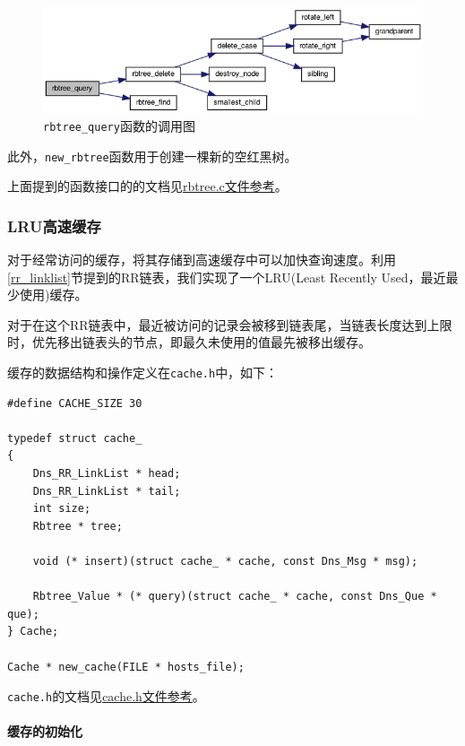 \documentclass[lang=cn,11pt,a4paper,cite=authornum]{paper}
\begin{document}
\begin{figure}[htbp]

    \centering
    \includegraphics[width=0.8\linewidth]{./APIdoc/rbtree_8c_a7460cf092b0132ece0a692cd84a26456_cgraph.png}
    \caption{\texttt{rbtree_query}函数的调用图\label{fig:rbtree_query_call}}

\end{figure}

此外，\texttt{new_rbtree}函数用于创建一棵新的空红黑树。

上面提到的函数接口的的文档见\href{run:./APIdoc/rbtree_8c.html}{rbtree.c文件参考}。

\subsubsection{LRU高速缓存}

对于经常访问的缓存，将其存储到高速缓存中可以加快查询速度。利用\ref{rr_linklist}节提到的RR链表，我们实现了一个LRU(Least Recently Used，最近最少使用)缓存。

对于在这个RR链表中，最近被访问的记录会被移到链表尾，当链表长度达到上限时，优先移出链表头的节点，即最久未使用的值最先被移出缓存。

缓存的数据结构和操作定义在\texttt{cache.h}中，如下：

\begin{code}
\begin{verbatim}
#define CACHE_SIZE 30
 
typedef struct cache_
{
    Dns_RR_LinkList * head; 
    Dns_RR_LinkList * tail; 
    int size; 
    Rbtree * tree; 
    
    void (* insert)(struct cache_ * cache, const Dns_Msg * msg);
    
    Rbtree_Value * (* query)(struct cache_ * cache, const Dns_Que * que);
} Cache;
 
Cache * new_cache(FILE * hosts_file);
\end{verbatim}
\end{code}

\texttt{cache.h}的文档见\href{run:./APIdoc/cache_8h.html}{cache.h文件参考}。

\paragraph{缓存的初始化}
\end{document}
